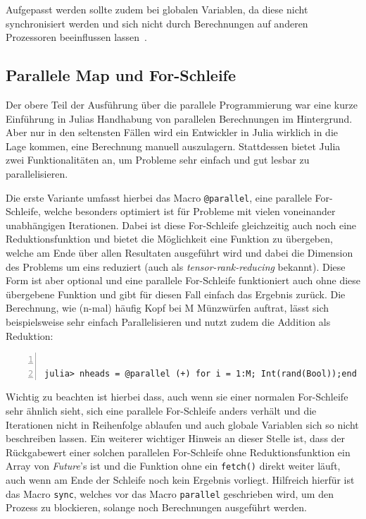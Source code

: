 \documentclass[proseminar,german,utf8]{zihpub}
\begin{document}
Aufgepasst werden sollte zudem bei globalen Variablen, da diese nicht synchronisiert werden und sich nicht durch Berechnungen auf anderen Prozessoren beeinflussen lassen~\cite{JuliaLangDocumentation}.

\subsection{Parallele Map und For-Schleife }

Der obere Teil der Ausführung über die parallele Programmierung war eine kurze Einführung in Julias Handhabung von parallelen Berechnungen im Hintergrund. Aber nur in den seltensten Fällen wird ein Entwickler in Julia wirklich in die Lage kommen, eine Berechnung manuell auszulagern. Stattdessen bietet Julia zwei Funktionalitäten an, um Probleme sehr einfach und gut lesbar zu parallelisieren. 

Die erste Variante umfasst hierbei das Macro \verb|@parallel|, eine parallele For-Schleife, welche besonders optimiert ist für Probleme mit vielen voneinander unabhängigen Iterationen. Dabei ist diese For-Schleife gleichzeitig auch noch eine Reduktionsfunktion und bietet die Möglichkeit eine Funktion zu übergeben, welche am Ende über allen Resultaten ausgeführt wird und dabei die Dimension des Problems um eins reduziert (auch als \textit{tensor-rank-reducing} bekannt). Diese Form ist aber optional und eine parallele For-Schleife funktioniert auch ohne diese übergebene Funktion und gibt für diesen Fall einfach das Ergebnis zurück. Die Berechnung, wie (n-mal) häufig Kopf bei M Münzwürfen auftrat, lässt sich beispielsweise sehr einfach Parallelisieren und nutzt zudem die Addition als Reduktion:
\begin{Verbatim}[baselinestretch=1,fontsize=\scriptsize,numbers=left,stepnumber=5,xleftmargin=1cm,xrightmargin=1cm]

julia> nheads = @parallel (+) for i = 1:M; Int(rand(Bool));end

\end{Verbatim}
Wichtig zu beachten ist hierbei dass, auch wenn sie einer normalen For-Schleife sehr ähnlich sieht, sich eine parallele For-Schleife anders verhält und die Iterationen nicht in Reihenfolge ablaufen und auch globale Variablen sich so nicht beschreiben lassen. Ein weiterer wichtiger Hinweis an dieser Stelle ist, dass der Rückgabewert einer solchen parallelen For-Schleife ohne Reduktionsfunktion ein Array von \textit{Future}'s ist und die Funktion ohne ein \verb|fetch()| direkt weiter läuft, auch wenn am Ende der Schleife noch kein Ergebnis vorliegt. Hilfreich hierfür ist das Macro \verb|sync|, welches vor das Macro \verb|parallel| geschrieben wird, um den Prozess zu blockieren, solange noch Berechnungen ausgeführt werden. 
\end{document}
